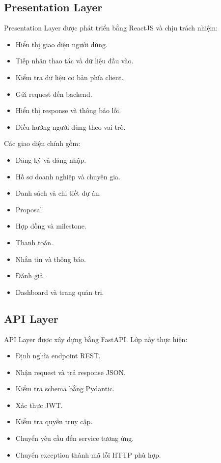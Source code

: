 \subsection{Presentation Layer}

Presentation Layer được phát triển bằng ReactJS và chịu trách nhiệm:

\begin{itemize}
    \item Hiển thị giao diện người dùng.
    \item Tiếp nhận thao tác và dữ liệu đầu vào.
    \item Kiểm tra dữ liệu cơ bản phía client.
    \item Gửi request đến backend.
    \item Hiển thị response và thông báo lỗi.
    \item Điều hướng người dùng theo vai trò.
\end{itemize}

Các giao diện chính gồm:

\begin{itemize}
    \item Đăng ký và đăng nhập.
    \item Hồ sơ doanh nghiệp và chuyên gia.
    \item Danh sách và chi tiết dự án.
    \item Proposal.
    \item Hợp đồng và milestone.
    \item Thanh toán.
    \item Nhắn tin và thông báo.
    \item Đánh giá.
    \item Dashboard và trang quản trị.
\end{itemize}

\subsection{API Layer}

API Layer được xây dựng bằng FastAPI. Lớp này thực hiện:

\begin{itemize}
    \item Định nghĩa endpoint REST.
    \item Nhận request và trả response JSON.
    \item Kiểm tra schema bằng Pydantic.
    \item Xác thực JWT.
    \item Kiểm tra quyền truy cập.
    \item Chuyển yêu cầu đến service tương ứng.
    \item Chuyển exception thành mã lỗi HTTP phù hợp.
\end{itemize}


